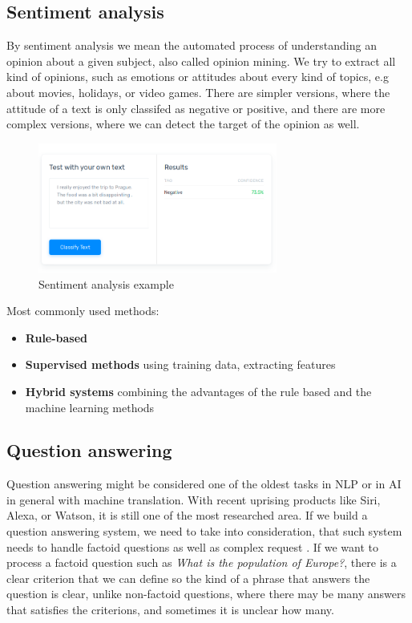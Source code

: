 \subsection{Sentiment analysis}

By sentiment analysis we mean the automated process of understanding an opinion about a given subject, also called opinion mining. We try to extract all kind of opinions, such as emotions or attitudes about every kind of topics, e.g about movies, holidays, or video games. There are simpler versions, where the attitude of a text is only classifed as negative or positive, and there are more complex versions, where we can detect the target of the opinion as well.

\begin{figure}[h]
	\centering
	\includegraphics[width=0.7\textwidth]{figures/sentiment}
	\caption{Sentiment analysis example}
	\label{fig:sen}
\end{figure}
Most commonly used methods:
\begin{itemize}
	\item \textbf{Rule-based}
	\item \textbf{Supervised methods} using training data, extracting features
	\item \textbf{Hybrid systems} combining the advantages of the rule based and the machine learning methods
\end{itemize}

\subsection{Question answering}
Question answering might be considered one of the oldest tasks in NLP or in AI in general with machine translation. With recent uprising products like Siri, Alexa, or Watson, it is still one of the most researched area.
If we build a question answering system, we need to take into consideration, that such system needs to handle factoid questions as well as complex request \cite{Ralph:2017}. If we want to process a factoid question such as \textit{What is the population of Europe?}, there is a clear criterion that we can define so the kind of a phrase that answers the question is clear, unlike non-factoid questions, where there may be many answers that satisfies the criterions, and sometimes it is unclear how many.


